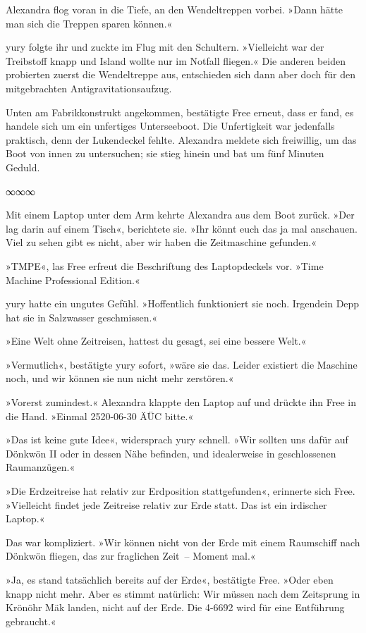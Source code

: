 Alexandra flog voran in die Tiefe, an den Wendeltreppen vorbei. »Dann hätte man sich die Treppen sparen können.«

yury folgte ihr und zuckte im Flug mit den Schultern. »Vielleicht war der Treibstoff knapp und Island wollte nur im Notfall fliegen.« Die anderen beiden probierten zuerst die Wendeltreppe aus, entschieden sich dann aber doch für den mitgebrachten Antigravitationsaufzug.

Unten am Fabrikkonstrukt angekommen, bestätigte Free erneut, dass er fand, es handele sich um ein unfertiges Unterseeboot. Die Unfertigkeit war jedenfalls praktisch, denn der Lukendeckel fehlte. Alexandra meldete sich freiwillig, um das Boot von innen zu untersuchen; sie stieg hinein und bat um fünf Minuten Geduld.

\begin{center}
∞∞∞
\end{center}

Mit einem Laptop unter dem Arm kehrte Alexandra aus dem Boot zurück. »Der lag darin auf einem Tisch«, berichtete sie. »Ihr könnt euch das ja mal anschauen. Viel zu sehen gibt es nicht, aber wir haben die Zeitmaschine gefunden.«

»TMPE«, las Free erfreut die Beschriftung des Laptopdeckels vor. »Time Machine Professional Edition.«

yury hatte ein ungutes Gefühl. »Hoffentlich funktioniert sie noch. Irgendein Depp hat sie in Salzwasser geschmissen.«

»Eine Welt ohne Zeitreisen, hattest du gesagt, sei eine bessere Welt.«

»Vermutlich«, bestätigte yury sofort, »wäre sie das. Leider existiert die Maschine noch, und wir können sie nun nicht mehr zerstören.«

»Vorerst zumindest.« Alexandra klappte den Laptop auf und drückte ihn Free in die Hand. »Einmal 2520-06-30 ÄÜC bitte.«

»Das ist keine gute Idee«, widersprach yury schnell. »Wir sollten uns dafür auf Dönkwön II oder in dessen Nähe befinden, und idealerweise in geschlossenen Raumanzügen.«

»Die Erdzeitreise hat relativ zur Erdposition stattgefunden«, erinnerte sich Free. »Vielleicht findet jede Zeitreise relativ zur Erde statt. Das ist ein irdischer Laptop.«

Das war kompliziert. »Wir können nicht von der Erde mit einem Raumschiff nach Dönkwön fliegen, das zur fraglichen Zeit~– Moment mal.«

»Ja, es stand tatsächlich bereits auf der Erde«, bestätigte Free. »Oder eben knapp nicht mehr. Aber es stimmt natürlich: Wir müssen nach dem Zeitsprung in Krönöhr Mäk landen, nicht auf der Erde. Die 4-6692 wird für eine Entführung gebraucht.«

